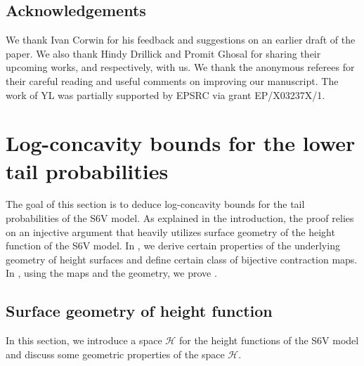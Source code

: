 \documentclass[reqno,11pt]{amsart}
\numberwithin{equation}{section}
\theoremstyle{definition}
\begin{document}
\subsection*{Acknowledgements}
{We thank Ivan Corwin for his feedback and suggestions on an earlier draft of the paper. We also thank Hindy Drillick and Promit Ghosal for sharing their upcoming works, \cite{hindy24} and \cite{gs24} respectively, with us. We thank the anonymous referees for their careful reading and useful comments
on improving our manuscript.
The work of YL was partially supported by EPSRC via grant EP/X03237X/1.}



\section{Log-concavity bounds for the lower tail probabilities}  \label{sec:ltconvex}

The goal of this section is to deduce log-concavity bounds for the tail probabilities of the S6V model. As explained in the introduction, the proof relies on an injective argument that heavily utilizes surface geometry of the height function of the S6V model. In , we derive certain properties of the underlying geometry of height surfaces and define certain class of bijective contraction maps. In , using the maps and the geometry, we prove .


\subsection{Surface geometry of height function} \label{sec3.1} In this section, we introduce a space $\mathscr{H}$ for the height functions of the S6V model and discuss some geometric properties of the space $\mathscr{H}$. 
\end{document}
